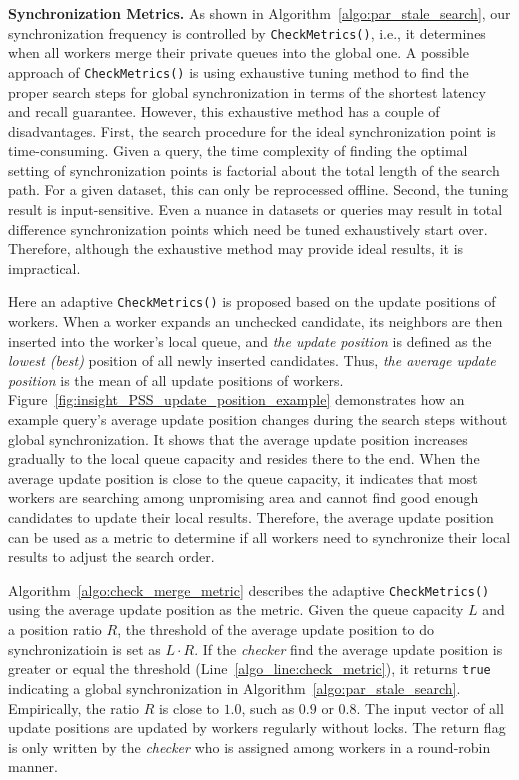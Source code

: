 \noindent\textbf{Synchronization Metrics.}
As shown in Algorithm~\ref{algo:par_stale_search}, our synchronization frequency is controlled by \texttt{CheckMetrics()}, i.e., it determines when all workers merge their private queues into the global one. 
A possible approach of \texttt{CheckMetrics()} is using exhaustive tuning method to find the proper search steps for global synchronization in terms of the shortest latency and recall guarantee. 
However, this exhaustive method has a couple of disadvantages. 
First, the search procedure for the ideal synchronization point is time-consuming. Given a query, the time complexity of finding the optimal setting of synchronization points is factorial about the total length of the search path.
For a given dataset, this can only be reprocessed offline.
Second, the tuning result is input-sensitive. Even a nuance in datasets or queries may result in total difference synchronization points which need be tuned exhaustively start over. Therefore, although the exhaustive method may provide ideal results, it is impractical.

Here an adaptive \texttt{CheckMetrics()} is proposed based on the update positions of workers. When a worker expands an unchecked candidate, its neighbors are then inserted into the worker's local queue, and \emph{the update position} is defined as the \emph{lowest (best)} position of all newly inserted candidates. Thus, \emph{the average update position} is the mean of all update positions of workers. 
Figure~\ref{fig:insight_PSS_update_position_example} demonstrates how an example query's average update position changes during the search steps without global synchronization. 
It shows that the average update position increases gradually to the local queue capacity and resides there to the end. 
When the average update position is close to the queue capacity, it indicates that most workers are searching among unpromising area and cannot find good enough candidates to update their local results.
Therefore, the average update position can be used as a metric to determine if all workers need to synchronize their local results to adjust the search order. 

Algorithm~\ref{algo:check_merge_metric} describes the adaptive \texttt{CheckMetrics()} using the average update position as the metric. Given the queue capacity $L$ and a position ratio $R$, the threshold of the average update position to do synchronizatioin is set as $L\cdot R$. 
If the \emph{checker} find the average update position is greater or equal the threshold (Line~\ref{algo_line:check_metric}), it returns \texttt{true} indicating a global synchronization in Algorithm~\ref{algo:par_stale_search}.
Empirically, the ratio $R$ is close to $1.0$, such as $0.9$ or $0.8$. The input vector of all update positions are updated by workers regularly without locks. The return flag is only written by the \emph{checker} who is assigned among workers in a round-robin manner.

